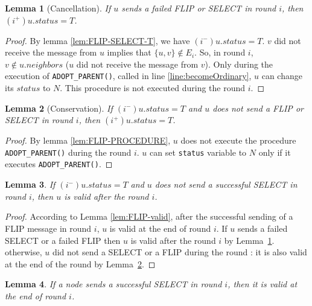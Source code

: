 \documentclass[twocolumn]{article}
\newtheorem{lemma}{Lemma}
\newcommand{\depends}[1]{}
\newcommand{\state}[3]{\ensuremath{(#2^{#3})#1}}
\newcommand{\uim}{\state{u}{i}{-}}
\newcommand{\uip}{\state{u}{i}{+}}
\begin{document}
\begin{lemma}[Cancellation]
  \label{lem:CANCEL}
  If $u$ sends a failed FLIP or SELECT in round $i$, then $\uip.status = T$.
\depends{\ref{lem:FLIP-SELECT-T}}
\end{lemma}

\begin{proof}
By lemma \ref{lem:FLIP-SELECT-T}, we have $\uim.status = T$. 
$v$ did not receive the message from $u$ implies that $\{u,v\}\notin E_i$. 
So, in round $i$, $v \notin u.neighbors$ ($u$ did not receive 
the message from $v$).
Only during the execution of \texttt{ADOPT\_PARENT()},
called in line \ref{line:becomeOrdinary}, $u$ can change its $status$ to $N$.
This procedure is not executed during the round $i$.
 \end{proof}

\begin{lemma}[Conservation]
  \label{lem:conservation}
  If $\uim.status=T$ and $u$ does not send a FLIP or SELECT in round $i$, then $\uip.status=T$.
\end{lemma}

\begin{proof}
By lemma \ref{lem:FLIP-PROCEDURE}, $u$ does not execute the procedure \texttt{ADOPT\_PARENT()} during the round $i$.
$u$ can set \texttt{status} variable to $N$ only if it executes \texttt{ADOPT\_PARENT()}. 
 \end{proof}


\begin{lemma}
  \label{lem:all-but-SELECT-valid}
  If $\uim.status=T$ and $u$ does not send a successful SELECT in round $i$, then $u$ is valid after the round $i$.
\end{lemma}

\begin{proof}
According to Lemma \ref{lem:FLIP-valid}, after the successful sending of a FLIP message in round $i$, $u$ is valid at the end of round $i$. 
If $u$ sends a failed SELECT or a failed FLIP then $u$ is valid after the round $i$ by Lemma~\ref{lem:CANCEL}.
otherwise, $u$ did not send a SELECT or a FLIP during the round :
it is also valid at the end of the round by Lemma~\ref{lem:conservation}.
 \end{proof}

\begin{lemma}
\label{lem:select_valid}
If a node sends a successful SELECT in round $i$,
then it is valid at the end of round $i$. 
\depends{\ref{lem:permutation}, \ref{lem:regeneration}, \ref{lem:adoption}, \ref{lem:send-T-become-N-parent-T}, \ref{lem:selected-T}, \ref{lem:selected-N}, \ref{lem:all-but-SELECT-valid}}
\end{lemma}
\end{document}
